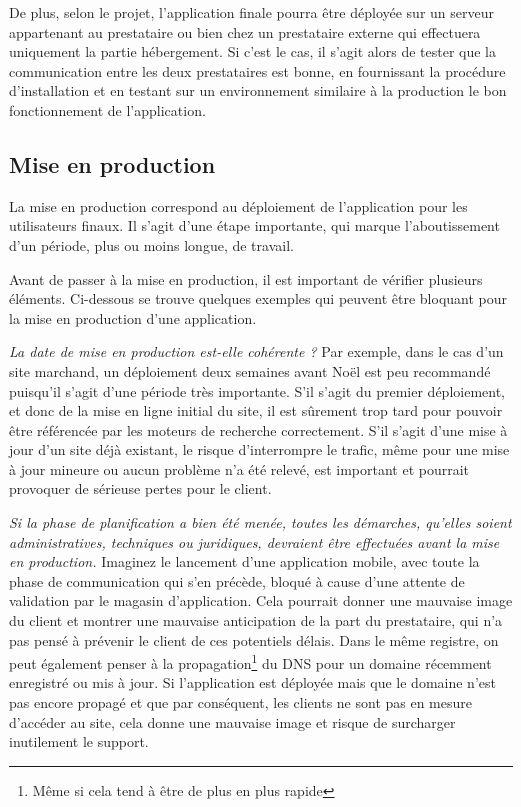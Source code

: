 De plus, selon le projet, l'application finale pourra être déployée sur un serveur appartenant au prestataire ou bien chez un prestataire externe qui effectuera uniquement la partie hébergement. Si c'est le cas, il s'agit alors de tester que la communication entre les deux prestataires est bonne, en fournissant la procédure d'installation et en testant sur un environnement similaire à la production le bon fonctionnement de l'application.

\subsection{Mise en production}

La mise en production correspond au déploiement de l'application pour les utilisateurs finaux. Il s'agit d'une étape importante, qui marque l'aboutissement d'un période, plus ou moins longue, de travail.

Avant de passer à la mise en production, il est important de vérifier plusieurs éléments. Ci-dessous se trouve quelques exemples qui peuvent être bloquant pour la mise en production d'une application.

\textit{La date de mise en production est-elle cohérente ?} Par exemple, dans le cas d'un site marchand, un déploiement deux semaines avant Noël est peu recommandé puisqu'il s'agit d'une période très importante. S'il s'agit du premier déploiement, et donc de la mise en ligne initial du site, il est sûrement trop tard pour pouvoir être référencée par les moteurs de recherche correctement. S'il s'agit d'une mise à jour d'un site déjà existant, le risque d'interrompre le trafic, même pour une mise à jour mineure ou aucun problème n'a été relevé, est important et pourrait provoquer de sérieuse pertes pour le client.

\textit{Si la phase de planification a bien été menée, toutes les démarches, qu'elles soient administratives, techniques ou juridiques, devraient être effectuées avant la mise en production.} Imaginez le lancement d'une application mobile, avec toute la phase de communication qui s'en précède, bloqué à cause d'une attente de validation par le magasin d'application. Cela pourrait donner une mauvaise image du client et montrer une mauvaise anticipation de la part du prestataire, qui n'a pas pensé à prévenir le client de ces potentiels délais. Dans le même registre, on peut également penser à la propagation\footnote{Même si cela tend à être de plus en plus rapide} du \gls{DNS} pour un domaine récemment enregistré ou mis à jour. Si l'application est déployée mais que le domaine n'est pas encore propagé et que par conséquent, les clients ne sont pas en mesure d'accéder au site, cela donne une mauvaise image et risque de surcharger inutilement le support.

